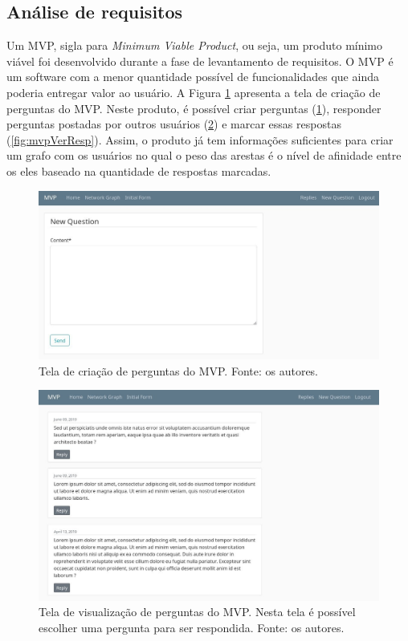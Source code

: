 \subsection{Análise de requisitos}

Um MVP, sigla para \emph{Minimum Viable Product}, ou seja, um produto mínimo viável foi desenvolvido durante a fase de levantamento de requisitos. O MVP é um software com a menor quantidade possível de funcionalidades que ainda poderia entregar valor ao usuário. A Figura \ref{fig:mvpCriarQuest} apresenta a tela de criação de perguntas do MVP. Neste produto, é possível criar perguntas (\ref{fig:mvpCriarQuest}), responder perguntas postadas por outros usuários (\ref{fig:mvpVerQuest}) e marcar essas respostas (\ref{fig:mvpVerResp}). Assim, o produto já tem informações suficientes para criar um grafo com os usuários no qual o peso das arestas é o nível de afinidade entre os eles baseado na quantidade de respostas marcadas.

\begin{figure}[!htb]
\centering
\includegraphics[width=14cm]{mvpCriarQuest.png}
\caption{Tela de criação de perguntas do MVP. Fonte: os autores.}
\label{fig:mvpCriarQuest}
\end{figure}

\begin{figure}[!htb]
\centering
\includegraphics[width=14cm]{mvpVerQuest.png}
\caption{Tela de visualização de perguntas do MVP. Nesta tela é possível escolher uma pergunta para ser respondida. Fonte: os autores.}
\label{fig:mvpVerQuest}
\end{figure}

